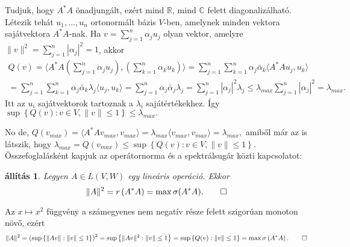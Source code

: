 \documentclass[9pt, a4paper, showtrims]{memoir}
\makeatletter
\renewenvironment{proof}[1][\proofname]
    {\par\pushQED{\qed}%
    \normalfont \topsep6\p@\@plus6\p@\relax
    \trivlist
    \item[\hskip\labelsep
        \itshape
    #1\@addpunct{:}]\ignorespaces}
    {\popQED\endtrivlist\@endpefalse}
\theoremstyle{plain}
\newtheorem{proposition}{állítás}[chapter]
\theoremstyle{remark}
\theoremstyle{definition}
\newcommand{\ip}[2]{\langle#1,#2\rangle}
\makeatother
\begin{document}
\begin{proof}
    Tudjuk, hogy $A^\ast A$ önadjungált, ezért mind $\mathbb{R}$, mind $\mathbb{C}$ felett diagonalizálható.
    Létezik tehát $u_1,\dots,u_n$ ortonormált bázis $V$-ben, 
    amelynek minden vektora sajátvektora $A^\ast A$-nak.
    Ha $v=\sum_{j=1}^n\alpha_ju_j$ olyan vektor,
    amelyre $\|v\|^2=\sum_{j=1}^n|\alpha_j|^2=1$,
    akkor
    \begin{multline*}
        Q\left( v \right)
        =
        \ip{A^\ast A\left( \sum_{j=1}^n\alpha_ju_j \right)}{\left( \sum_{k=1}^n\alpha_ku_k \right)}
        =
        \sum_{j=1}^n\sum_{k=1}^n\alpha_j\bar{\alpha}_k\ip{A^\ast Au_j}{u_k}
        \\
        =
        \sum_{j=1}^n\sum_{k=1}^n\alpha_j\bar{\alpha}_k\lambda_j\ip{u_j}{u_k}
        =
        \sum_{j=1}^n\alpha_j\bar{\alpha}_j\lambda_j
        =
        \sum_{j=1}^n|\alpha_j|^2\lambda_j
        \leq
        \lambda_{max}\sum_{j=1}^n|\alpha_j|^2
        =
        \lambda_{max}.
    \end{multline*}
    Itt az $u_i$ sajátvektorok tartoznak a $\lambda_i$ sajátértékekhez.
    Így
    \begin{math}
        \sup\left\{ Q\left( v \right):v\in V,\|v\|\leq 1 \right\}
        \leq 
        \lambda_{max}.
    \end{math}

    No de, 
    \begin{math}
        Q\left( v_{max} \right)
        =
        \ip{A^\ast Av_{max}}{v_{max}}
        =
        \lambda_{max}\ip{v_{max}}{v_{max}}
        =\lambda_{max},
    \end{math}
    amiből már az is látszik, hogy
    \begin{math}
        \lambda_{max}
        =
        Q\left( v_{max} \right)
        \leq
        \sup\left\{ Q\left( v \right):v\in V,\|v\|\leq 1 \right\}.
    \end{math}
\end{proof}
Összefoglalásként kapjuk az operátornorma és a spektrálsugár közti kapcsolatot:
\begin{proposition}
    Legyen $A\in L\left( V,W \right)$ egy lineáris operáció.
    Ekkor
    \[
        \|A\|^2=r\left( A^\ast A \right)=\max\sigma(A^\ast A).
        \qedhere
    \]
\end{proposition}
\begin{proof}
    Az $x \mapsto x^2$ függvény a számegyenes nem negatív része felett szigorúan monoton növő,
    ezért
    \[
        \|A\|^2
        =
        \left( 
            \sup\left\{ \|Av\|:\|v\|\leq 1 \right\}
        \right)^2
        =
        \sup\left\{ \|Av\|^2:\|v\|\leq 1 \right\}
        =
        \sup\left\{ Q(v):\|v\|\leq 1 \right\}
        =
        \max\sigma\left( A^\ast A \right).
        \qedhere
    \]
\end{proof}
\end{document}
